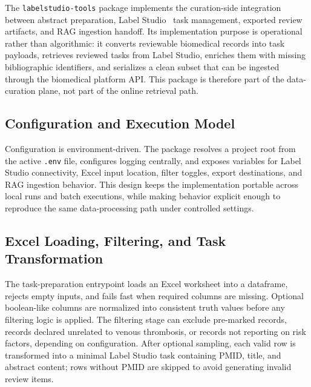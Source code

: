 The \texttt{labelstudio-tools} package implements the curation-side integration between abstract preparation, Label Studio~\cite{tkachenko2020labelstudio} task management, exported review artifacts, and RAG ingestion handoff. Its implementation purpose is operational rather than algorithmic: it converts reviewable biomedical records into task payloads, retrieves reviewed tasks from Label Studio, enriches them with missing bibliographic identifiers, and serializes a clean subset that can be ingested through the biomedical platform API. This package is therefore part of the data-curation plane, not part of the online retrieval path.

\subsection{Configuration and Execution Model}

Configuration is environment-driven. The package resolves a project root from the active \texttt{.env} file, configures logging centrally, and exposes variables for Label Studio connectivity, Excel input location, filter toggles, export destinations, and RAG ingestion behavior. This design keeps the implementation portable across local runs and batch executions, while making behavior explicit enough to reproduce the same data-processing path under controlled settings.

\subsection{Excel Loading, Filtering, and Task Transformation}

The task-preparation entrypoint loads an Excel worksheet into a dataframe, rejects empty inputs, and fails fast when required columns are missing. Optional boolean-like columns are normalized into consistent truth values before any filtering logic is applied. The filtering stage can exclude pre-marked records, records declared unrelated to venous thrombosis, or records not reporting on risk factors, depending on configuration. After optional sampling, each valid row is transformed into a minimal Label Studio task containing PMID, title, and abstract content; rows without PMID are skipped to avoid generating invalid review items.

